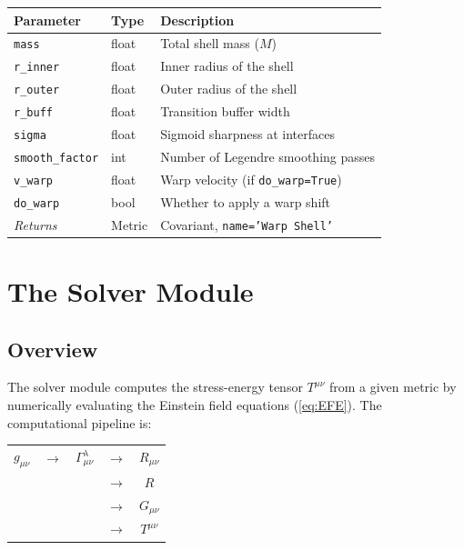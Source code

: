 \documentclass[11pt, a4paper, twoside]{report}
\begin{document}
\begin{center}
\begin{tabularx}{\linewidth}{llX}
  \toprule
  Parameter      & Type  & Description \\
  \midrule
  \texttt{mass}         & float & Total shell mass ($M$) \\
  \texttt{r\_inner}     & float & Inner radius of the shell \\
  \texttt{r\_outer}     & float & Outer radius of the shell \\
  \texttt{r\_buff}      & float & Transition buffer width \\
  \texttt{sigma}        & float & Sigmoid sharpness at interfaces \\
  \texttt{smooth\_factor} & int & Number of Legendre smoothing passes \\
  \texttt{v\_warp}      & float & Warp velocity (if \texttt{do\_warp=True}) \\
  \texttt{do\_warp}     & bool  & Whether to apply a warp shift \\
  \midrule
  \emph{Returns} & Metric & Covariant, \texttt{name='Warp Shell'} \\
  \bottomrule
\end{tabularx}
\end{center}

\chapter{The Solver Module}
\label{chap:solver}

\section{Overview}

The solver module computes the stress-energy tensor $T^{\mu\nu}$ from a
given metric by numerically evaluating the Einstein field equations
(\cref{eq:EFE}).  The computational pipeline is:

\begin{center}
\begin{tabular}{ccccc}
  $g_{\mu\nu}$ & $\to$ & $\varGamma^\lambda_{\mu\nu}$ & $\to$ &
  $R_{\mu\nu}$ \\[0.3em]
  & & & $\to$ & $R$ \\[0.3em]
  & & & $\to$ & $G_{\mu\nu}$ \\[0.3em]
  & & & $\to$ & $T^{\mu\nu}$
\end{tabular}
\end{center}
\end{document}
